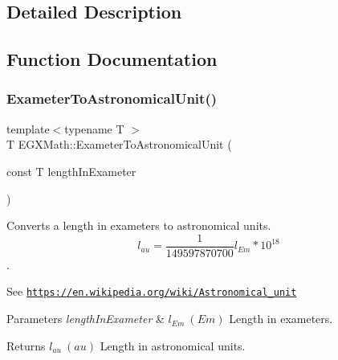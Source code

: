 \subsection{Detailed Description}


\subsection{Function Documentation}
\mbox{\label{group___e_g_x_math-_conversions-_length_conversions-_exameter-_astronomical_gafe75957564bfe2508c37089fece97c41}} 
\subsubsection{\texorpdfstring{Exameter\+To\+Astronomical\+Unit()}{ExameterToAstronomicalUnit()}}
{\footnotesize\ttfamily template$<$typename T $>$ \\
T E\+G\+X\+Math\+::\+Exameter\+To\+Astronomical\+Unit (\begin{DoxyParamCaption}\item[{const T}]{length\+In\+Exameter }\end{DoxyParamCaption})}



Converts a length in exameters to astronomical units. \[ l_{au}= \frac{1}{149597870700} l_{Em} * 10^{18} \]. 

See \href{https://en.wikipedia.org/wiki/Astronomical_unit}{\tt https\+://en.\+wikipedia.\+org/wiki/\+Astronomical\+\_\+unit} 
\begin{DoxyParams}{Parameters}
{\em length\+In\+Exameter} & $ l_{Em}\ (Em)$ Length in exameters. \\
\hline
\end{DoxyParams}
\begin{DoxyReturn}{Returns}
$ l_{au}\ (au)$ Length in astronomical units. 
\end{DoxyReturn}
\mbox{\label{group___e_g_x_math-_conversions-_length_conversions-_exameter-_astronomical_ga3867a3c149542e86e92d12147fd6d34e}} 
